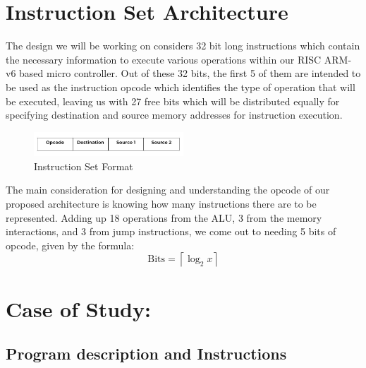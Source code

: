 \documentclass[9pt,a4paper,twoside]{tau}
\begin{document}
    
        
        \section{Instruction Set Architecture}


        The design we will be working on considers 32 bit long instructions which contain the necessary information to execute various operations within our RISC ARM-v6 based micro controller. Out of these 32 bits, the first 5 of them are intended to be used as the instruction opcode which identifies the type of operation that will be executed, leaving us with 27 free bits which will be distributed equally for specifying destination and source memory addresses for instruction execution. 

        \begin{figure}[h]  %
            \centering  %
            \includegraphics[width=0.5\textwidth]{images/ISA.JPG}
            \caption{Instruction Set Format}
            \label{fig:ISA Format}
        \end{figure}

        The main consideration for designing and understanding the opcode of our proposed architecture is knowing how many instructions there are to be represented. Adding up 18 operations from the ALU, 3 from the memory interactions, and 3 from jump instructions, we come out to needing 5 bits of opcode, given by the formula:
        \begin{equation}
            \text{Bits} = \left\lceil \log_{2}{x} \right\rceil
        \end{equation}
    


\section{Case of Study:}
    \subsection{Program description and Instructions}
\end{document}
